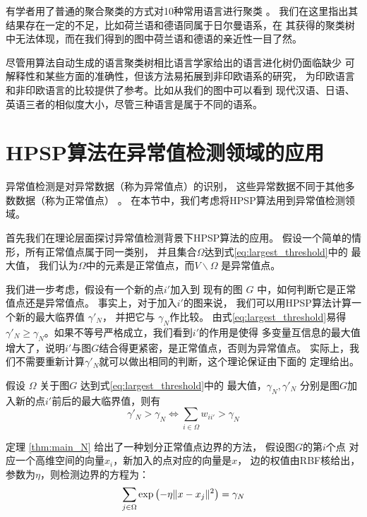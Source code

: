有学者用了普通的聚合聚类的方式对10种常用语言进行聚类 \cite{al2017characterization}。
我们在这里指出其结果存在一定的不足，比如荷兰语和德语同属于日尔曼语系，在
其获得的聚类树中无法体现，而在我们得到的图中荷兰语和德语的亲近性一目了然。

尽管用算法自动生成的语言聚类树相比语言学家给出的语言进化树仍面临缺少
可解释性和某些方面的准确性，但该方法易拓展到非印欧语系的研究，
为印欧语言和非印欧语言的比较提供了参考。比如从我们的图中可以看到
现代汉语、日语、英语三者的相似度大小，尽管三种语言是属于不同的语系。



\section{HPSP算法在异常值检测领域的应用}\label{sec:outlier}
异常值检测是对异常数据（称为异常值点）的识别，
这些异常数据不同于其他多数数据（称为正常值点）
\citep{grubbs1969procedures}。
在本节中，我们考虑将HPSP算法用到异常值检测领域。

首先我们在理论层面探讨异常值检测背景下HPSP算法的应用。
假设一个简单的情形，所有正常值点属于同一类别，
并且集合$\Omega$达到式\eqref{eq:largest_threshold}中的
最大值，
我们认为$\Omega$中的元素是正常值点，而$V\backslash \Omega$ 是异常值点。

我们进一步考虑，假设有一个新的点$i'$加入到
现有的图 $G$ 中，如何判断它是正常值点还是异常值点。 
事实上，对于加入$i'$的图来说，
我们可以用HPSP算法计算一个新的最大临界值
$\gamma'_N$，
并把它与 $\gamma_N$作比较。 由式\eqref{eq:largest_threshold}易得
$\gamma'_N \geq \gamma_N$。如果不等号严格成立，我们看到$i'$的作用是使得
多变量互信息的最大值增大了，说明$i'$与图$G$结合得更紧密，是正常值点，否则为异常值点。
实际上，我们不需要重新计算$\gamma'_N$就可以做出相同的判断，这个理论保证由下面的
定理给出。
\begin{theorem}\label{thm:main_N}
  假设 $\Omega$ 关于图$G$ 达到式\eqref{eq:largest_threshold}中的
  最大值，$\gamma_N, \gamma'_N$ 分别是图$G$加入新的点$i'$前后的最大临界值，则有
\begin{equation}
\gamma'_N > \gamma_N \iff  \sum_{i \in \Omega} w_{ii'} > \gamma_N 
\end{equation}
\end{theorem}
定理 \ref{thm:main_N} 给出了一种划分正常值点边界的方法，
假设图$G$的第$i$个点
对应一个高维空间的向量$x_i$，新加入的点对应的向量是$x$，
边的权值由RBF核给出，参数为$\eta$，则检测边界的方程为：
\begin{equation}\label{eq:sum_exp_gamma_N}
  \sum_{j \in \Omega} \exp\left(-\eta \lVert x - x_j\rVert^2 \right)= \gamma_N
\end{equation}

